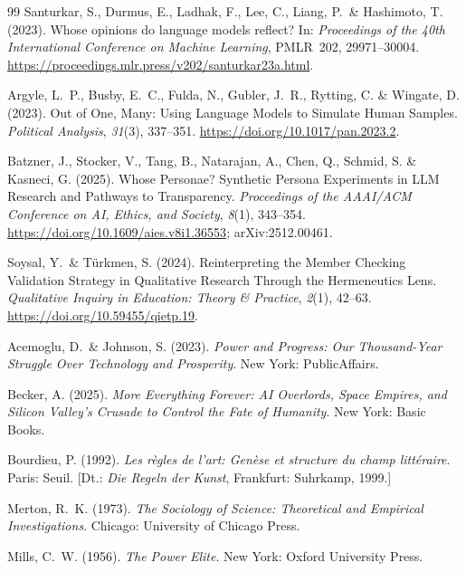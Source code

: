 \documentclass[12pt,a4paper]{article}
\begin{document}
\begin{thebibliography}{99}
  Santurkar, S., Durmus, E., Ladhak, F., Lee, C., Liang, P.~\& Hashimoto, T. (2023).
  Whose opinions do language models reflect?
  In: \textit{Proceedings of the 40th International Conference on Machine Learning},
  PMLR~202, 29971--30004.
  \url{https://proceedings.mlr.press/v202/santurkar23a.html}.

  Argyle, L.~P., Busby, E.~C., Fulda, N., Gubler, J.~R., Rytting, C. \& Wingate, D. (2023).
  Out of One, Many: Using Language Models to Simulate Human Samples.
  \textit{Political Analysis}, \textit{31}(3), 337--351.
  \url{https://doi.org/10.1017/pan.2023.2}.

  Batzner, J., Stocker, V., Tang, B., Natarajan, A., Chen, Q., Schmid, S. \& Kasneci, G. (2025).
  Whose Personae? Synthetic Persona Experiments in LLM Research and Pathways to Transparency.
  \textit{Proceedings of the AAAI/ACM Conference on AI, Ethics, and Society}, \textit{8}(1), 343--354.
  \url{https://doi.org/10.1609/aies.v8i1.36553}; arXiv:2512.00461.

  Soysal, Y.~\& Türkmen, S. (2024).
  Reinterpreting the Member Checking Validation Strategy in Qualitative Research Through the Hermeneutics Lens.
  \textit{Qualitative Inquiry in Education: Theory \& Practice}, \textit{2}(1), 42--63.
  \url{https://doi.org/10.59455/qietp.19}.

  Acemoglu, D.~\& Johnson, S. (2023).
  \textit{Power and Progress: Our Thousand-Year Struggle Over Technology and Prosperity}.
  New York: PublicAffairs.

  Becker, A. (2025).
  \textit{More Everything Forever: AI Overlords, Space Empires, and Silicon Valley's Crusade to Control the Fate of Humanity}.
  New York: Basic Books.

  Bourdieu, P. (1992).
  \textit{Les règles de l'art: Genèse et structure du champ littéraire}.
  Paris: Seuil.
  [Dt.: \textit{Die Regeln der Kunst}, Frankfurt: Suhrkamp, 1999.]

  Merton, R.~K. (1973).
  \textit{The Sociology of Science: Theoretical and Empirical Investigations}.
  Chicago: University of Chicago Press.

  Mills, C.~W. (1956).
  \textit{The Power Elite}.
  New York: Oxford University Press.


\end{thebibliography}
\end{document}
